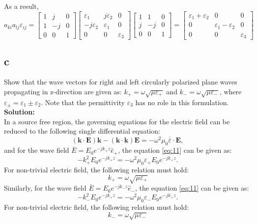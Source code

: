 \documentclass[11pt]{amsart}
\begin{document}
As a result,
\begin{equation}
a_{ki}a_{lj}\varepsilon_{ij}=
\begin{bmatrix}
1 & j & 0 \\ 
1 &  -j & 0 \\ 
0 & 0 & 1
\end{bmatrix}
\begin{bmatrix}
 \varepsilon_1 & j \varepsilon_2 & 0 \\ 
-j \varepsilon_2 &  \varepsilon_1 & 0 \\ 
0 & 0 & \varepsilon_3
\end{bmatrix}
\begin{bmatrix}
1 & 1 & 0 \\ 
j &  -j & 0 \\ 
0 & 0 & 1
\end{bmatrix}
=
\begin{bmatrix}
 \varepsilon_1 + \varepsilon_2 & 0 & 0 \\ 
0 &  \varepsilon_1 -\varepsilon_2 & 0 \\ 
0 & 0 & \varepsilon_3
\end{bmatrix}
\end{equation}

\subsection*{c}
Show that the wave vectors for right and left circularly polarized plane waves propagating
in z-direction are given as: $k_+ = \omega \sqrt{\mu \varepsilon_+}$ and $k_- = \omega \sqrt{\mu \varepsilon_-}$, where $\varepsilon_{\pm}=\varepsilon_1 \pm \varepsilon_2$. Note that the permittivity $\varepsilon_3$ has no
role in this formulation.
\\
\textbf{Solution:}\\
In a source free region, the governing equations for the electric field can be reduced to the following single differential equation: 
\begin{equation}
\label{eq:11}
(\mathbf{k}\cdot \mathbf{E})\mathbf{k}-(\mathbf{k} \cdot \mathbf{k})\mathbf{E}=-\omega^2 \mu_0\overline{\overline{\varepsilon}}\cdot \mathbf{E},
\end{equation}
and for the wave field $\bar{E}=E_0 e^{-j k_+ z}\hat{e}_+$, the equation \ref{eq:11} can be given as:
\begin{equation}
\label{eq:12}
-k_{+}^2 E_0 e^{-j k_+ z}=-\omega^2 \mu_0 \varepsilon_{+}E_0 e^{-j k_+ z}.
\end{equation}
For non-trivial electric field, the following relation must hold:
\begin{equation}
\label{eq:13}
k_+ = \omega \sqrt{\mu \varepsilon_+}
\end{equation}
Similarly, for the wave field $\bar{E}=E_0 e^{-j k_- z}\hat{e}_-$, the equation \ref{eq:11} can be given as:
\begin{equation}
\label{eq:14}
-k_{-}^2 E_0 e^{-j k_+ z}=-\omega^2 \mu_0 \varepsilon_{-}E_0 e^{-j k_+ z}.
\end{equation}
For non-trivial electric field, the following relation must hold:
\begin{equation}
\label{eq:15}
k_- = \omega \sqrt{\mu \varepsilon_-}
\end{equation}
\end{document}
